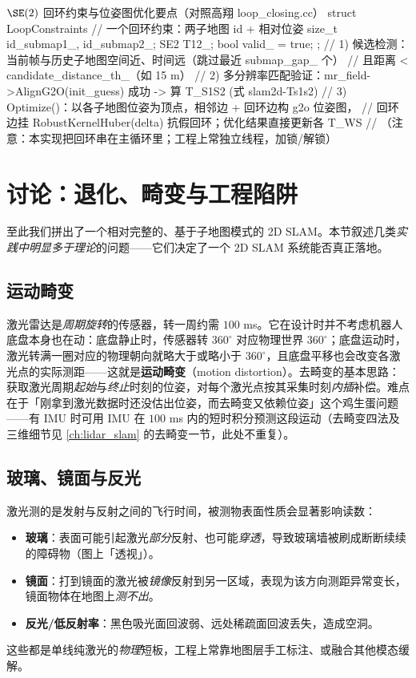 \begin{codebox}[C++]{$\SE(2)$ 回环约束与位姿图优化要点（对照高翔 loop\_closing.cc）}
struct LoopConstraints {                 // 一个回环约束：两子地图 id + 相对位姿
  size_t id_submap1_, id_submap2_;  SE2 T12_;  bool valid_ = true;
};
// 1) 候选检测：当前帧与历史子地图空间近、时间远（跳过最近 submap_gap_ 个）
//    且距离 < candidate_distance_th_（如 15 m）
// 2) 多分辨率匹配验证：mr_field->AlignG2O(init_guess) 成功 -> 算 T_S1S2 (式 slam2d-Ts1s2)
// 3) Optimize()：以各子地图位姿为顶点，相邻边 + 回环边构 g2o 位姿图，
//    回环边挂 RobustKernelHuber(delta) 抗假回环；优化结果直接更新各 T_WS
//    （注意：本实现把回环串在主循环里；工程上常独立线程，加锁/解锁）
\end{codebox}

\section{讨论：退化、畸变与工程陷阱}
\label{sec:slam2d-discuss}

至此我们拼出了一个相对完整的、基于子地图模式的 2D SLAM。本节叙述几类\emph{实践中明显多于理论}的问题——它们决定了一个 2D SLAM 系统能否真正落地。

\subsection{运动畸变}
\label{sec:slam2d-distortion}

激光雷达是\emph{周期旋转}的传感器，转一周约需 $100$ ms。它在设计时并不考虑机器人底盘本身也在动：底盘静止时，传感器转 $360^\circ$ 对应物理世界 $360^\circ$；底盘运动时，激光转满一圈对应的物理朝向就略大于或略小于 $360^\circ$，且底盘平移也会改变各激光点的实际测距——这就是\textbf{运动畸变}（motion distortion）。去畸变的基本思路：获取激光周期\emph{起始}与\emph{终止}时刻的位姿，对每个激光点按其采集时刻\emph{内插}补偿。难点在于「刚拿到激光数据时还没估出位姿，而去畸变又依赖位姿」这个鸡生蛋问题——有 IMU 时可用 IMU 在 $100$ ms 内的短时积分预测这段运动（去畸变四法及三维细节见 \cref{ch:lidar_slam} 的去畸变一节，此处不重复）。

\subsection{玻璃、镜面与反光}
\label{sec:slam2d-glass}

激光测的是发射与反射之间的飞行时间，被测物表面性质会显著影响读数：
\begin{itemize}
  \item \textbf{玻璃}：表面可能引起激光\emph{部分}反射、也可能\emph{穿透}，导致玻璃墙被刷成断断续续的障碍物（图上「透视」）。
  \item \textbf{镜面}：打到镜面的激光被\emph{镜像}反射到另一区域，表现为该方向测距异常变长，镜面物体在地图上\emph{测不出}。
  \item \textbf{反光/低反射率}：黑色吸光面回波弱、远处稀疏面回波丢失，造成空洞。
\end{itemize}
这些都是单线纯激光的\emph{物理}短板，工程上常靠地图层手工标注、或融合其他模态缓解。

